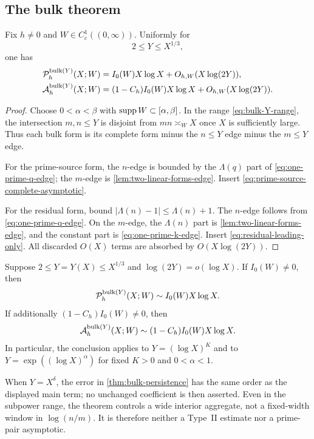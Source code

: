 \subsection{The bulk theorem}

\begin{theorem}
\label{thm:bulk-persistence}
Fix $h\ne0$ and $W\in C_c^1((0,\infty))$.  Uniformly for
\begin{equation}\label{eq:bulk-Y-range}
 2\leq Y\leq X^{1/3},
\end{equation}
one has
\begin{align}
 \mathcal P_h^{\mathrm{bulk}(Y)}(X;W)
 &=I_0(W)X\log X+O_{h,W}(X\log(2Y)),
 \label{eq:prime-source-bulk}\\
 \mathcal A_h^{\mathrm{bulk}(Y)}(X;W)
 &=(1-C_h)I_0(W)X\log X+O_{h,W}(X\log(2Y)).
 \label{eq:residual-bulk}
\end{align}
\end{theorem}

\begin{proof}
Choose $0<\alpha<\beta$ with $\operatorname{supp} W\subset[\alpha,\beta]$.  In the
range \eqref{eq:bulk-Y-range}, the intersection $m,n\leq Y$ is disjoint
from $mn\asymp_W X$ once $X$ is sufficiently large.  Thus each bulk form
is its complete form minus the $n\leq Y$ edge minus the $m\leq Y$ edge.

For the prime-source form, the $n$-edge is bounded by the
$\Lambda(q)$ part of \eqref{eq:one-prime-q-edge}; the $m$-edge is
\cref{lem:two-linear-forms-edge}.  Insert
\eqref{eq:prime-source-complete-asymptotic}.

For the residual form, bound $|\Lambda(n)-1|\leq\Lambda(n)+1$.  The
$n$-edge follows from \eqref{eq:one-prime-q-edge}.  On the $m$-edge, the
$\Lambda(n)$ part is \cref{lem:two-linear-forms-edge}, and the constant
part is \eqref{eq:one-prime-k-edge}.  Insert
\eqref{eq:residual-leading-only}.  All discarded $O(X)$ terms are absorbed
by $O(X\log(2Y))$.
\end{proof}

\begin{corollary}
\label{cor:subpower-edge-removal}
Suppose $2\leq Y=Y(X)\leq X^{1/3}$ and
$\log(2Y)=o(\log X)$.  If $I_0(W)\ne0$, then
\[
 \mathcal P_h^{\mathrm{bulk}(Y)}(X;W)\sim I_0(W)X\log X.
\]
If additionally $(1-C_h)I_0(W)\ne0$, then
\[
 \mathcal A_h^{\mathrm{bulk}(Y)}(X;W)
 \sim(1-C_h)I_0(W)X\log X.
\]
In particular, the conclusion applies to
$Y=(\log X)^K$ and to $Y=\exp((\log X)^\alpha)$ for fixed $K>0$ and
$0<\alpha<1$.
\end{corollary}

\begin{remark}
When $Y=X^\delta$, the error in
\cref{thm:bulk-persistence} has the same order as the displayed main term;
no unchanged coefficient is then asserted.  Even in the subpower range,
the theorem controls a wide interior aggregate, not a fixed-width window
in $\log(n/m)$.  It is therefore neither a Type~II estimate nor a
prime-pair asymptotic.
\end{remark}
